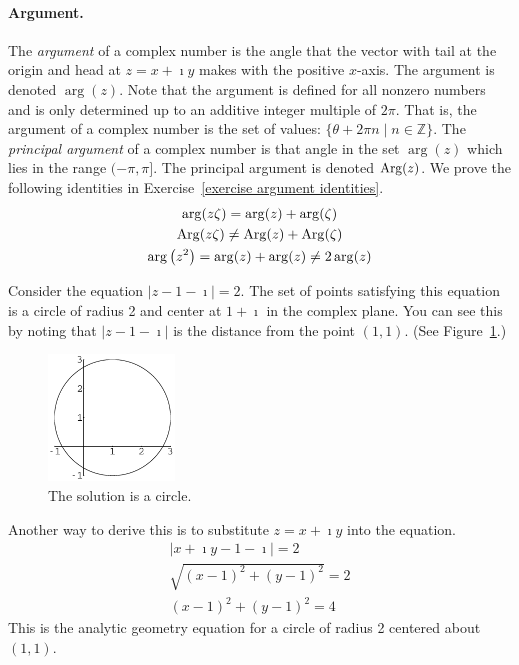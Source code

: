 \paragraph{Argument.}
The \textit{argument} of a complex number is the angle that the vector with
tail at the origin and head at $z = x + \imath y$ makes with the positive 
$x$-axis.  The argument is denoted $\arg(z)$. 
Note that the argument is defined for all nonzero numbers and 
is only determined up to an additive integer multiple
of $2 \pi$.  That is, the argument of a complex number is the set of values:
$\{ \theta + 2 \pi n \mid n \in \mathbb{Z}\}$.  The \textit{principal argument}
of a complex number is that angle in the set $\arg(z)$ which lies in the
range $(-\pi,\pi]$.  The principal argument is denoted $\mathop{\mathrm{Arg}}\nolimits(z)$.
We prove the following identities in Exercise~\ref{exercise argument identities}.
\begin{gather*}
  \arg(z \zeta) = \arg(z) + \arg(\zeta) \\
  \mathop{\mathrm{Arg}}\nolimits(z \zeta) \neq \mathop{\mathrm{Arg}}\nolimits(z) + \mathop{\mathrm{Arg}}\nolimits(\zeta) \\
  \arg\left( z^2 \right) = \arg(z) + \arg(z) \neq 2 \arg(z)
\end{gather*}



\begin{Example}
  Consider the equation $|z - 1 - \imath| = 2$.  The set of points satisfying 
  this equation
  is a circle of radius 2 and center at $1 + \imath$ in the complex plane.  You
  can see this by noting that $|z - 1 - \imath|$ is the distance from the point
  $(1,1)$.
  (See Figure~\ref{circ211}.)
  \begin{figure}[h!]
    \begin{center}
      \includegraphics[width=0.3\textwidth]{fcv/number/circ211}
    \end{center}
    \caption{The solution is a circle.}
    \label{circ211}
  \end{figure}

  Another way to derive this is to substitute $z = x + \imath y$ 
  into the equation.
  \begin{gather*}
    |x + \imath y - 1 - \imath| = 2 
    \\
    \sqrt{(x-1)^2 + (y-1)^2} = 2 
    \\
    (x-1)^2 + (y-1)^2 = 4
  \end{gather*}
  This is the analytic geometry equation for a circle of radius 2 
  centered about $(1,1)$.  
\end{Example}








